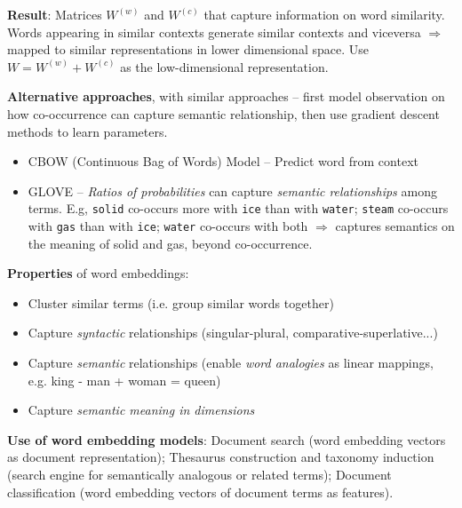   \textbf{Result}: Matrices $W^{(w)}$ and $W^{(c)}$ that capture information on word similarity. Words appearing in similar contexts generate similar contexts and viceversa $\Rightarrow$ mapped to similar representations in lower dimensional space. Use $W=W^{(w)}+W^{(c)}$ as the low-dimensional representation.

  \textbf{Alternative approaches}, with similar approaches -- first model observation on how co-occurrence can capture semantic relationship, then use gradient descent methods to learn parameters.
  \begin{itemize}
    \item CBOW (Continuous Bag of Words) Model -- Predict word from context
    \item GLOVE -- \emph{Ratios of probabilities} can capture \emph{semantic relationships} among terms. E.g, \texttt{solid} co-occurs more with \texttt{ice} than with \texttt{water}; \texttt{steam} co-occurs with \texttt{gas} than with \texttt{ice}; \texttt{water} co-occurs with both $\Rightarrow$ captures semantics on the meaning of solid and gas, beyond co-occurrence.
  \end{itemize}

  \textbf{Properties} of word embeddings:
  \begin{itemize}
    \item Cluster similar terms (i.e. group similar words together)
    \item Capture \emph{syntactic} relationships (singular-plural, comparative-superlative...)
    \item Capture \emph{semantic} relationships (enable \emph{word analogies} as linear mappings, e.g.  king - man + woman = queen)
    \item Capture \emph{semantic meaning in dimensions}
  \end{itemize}

  \textbf{Use of word embedding models}: Document search (word embedding vectors as document representation); Thesaurus construction and taxonomy induction (search engine for semantically analogous or related terms); Document classification (word embedding vectors of document terms as features).
